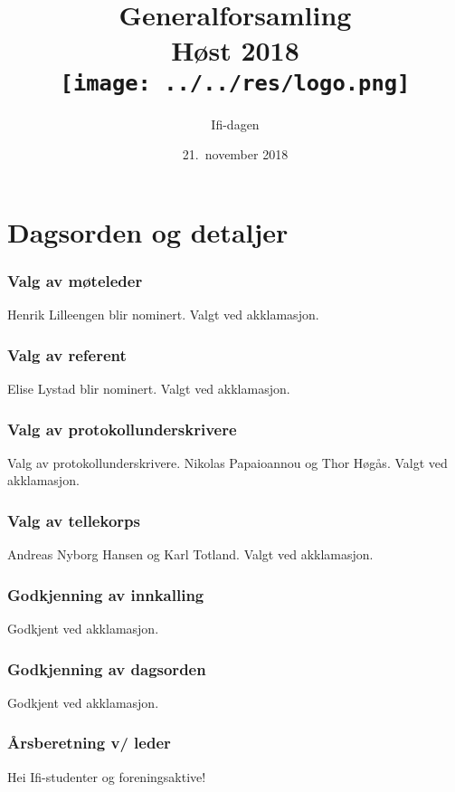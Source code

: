\documentclass[10pt,norsk,a4paper]{article}
\title{Generalforsamling \\
	Høst 2018\\[3cm]
	\texttt{[image: ../../res/logo.png]}\\}
\date{21.\ november 2018}
\author{Ifi-dagen}
\begin{document}
\maketitle{}
\newpage
\part{Dagsorden og detaljer}
\tableofcontents{}
\newpage


\section{Valg av møteleder}
Henrik Lilleengen blir nominert. Valgt ved akklamasjon.

\section{Valg av referent}
Elise Lystad blir nominert. Valgt ved akklamasjon.

\section{Valg av protokollunderskrivere}
Valg av protokollunderskrivere. Nikolas Papaioannou og Thor Høgås. Valgt ved
akklamasjon.

\section{Valg av tellekorps}
Andreas Nyborg Hansen og Karl Totland. Valgt ved akklamasjon.

\section{Godkjenning av innkalling}
Godkjent ved akklamasjon.

\section{Godkjenning av dagsorden}
Godkjent ved akklamasjon.

\section{Årsberetning v/ leder}
Hei Ifi-studenter og foreningsaktive!
\end{document}
